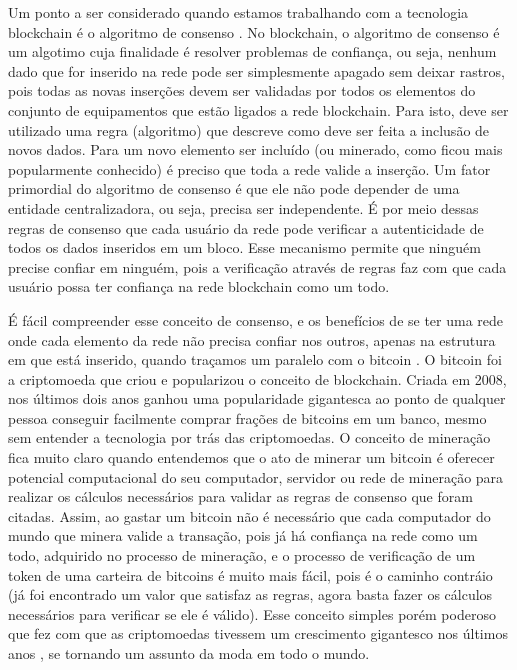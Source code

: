 Um ponto a ser considerado quando estamos trabalhando com a tecnologia blockchain é o algoritmo de consenso \cite{zheng2017overview}. No blockchain, o algoritmo de consenso é um algotimo cuja finalidade é resolver problemas de confiança, ou seja, nenhum dado que for inserido na rede pode ser simplesmente apagado sem deixar rastros, pois todas as novas inserções devem ser validadas por todos os elementos do conjunto de equipamentos que estão ligados a rede blockchain. Para isto, deve ser utilizado uma regra (algoritmo) que descreve como deve ser feita a inclusão de novos dados. Para um novo elemento ser incluído (ou minerado, como ficou mais popularmente conhecido) é preciso que toda a rede valide a inserção. Um fator primordial do algoritmo de consenso é que ele não pode depender de uma entidade centralizadora, ou seja, precisa ser independente. É por meio dessas regras de consenso que cada usuário da rede pode verificar a autenticidade de todos os dados inseridos em um bloco. Esse mecanismo permite que ninguém precise confiar em ninguém, pois a verificação através de regras faz com que cada usuário possa ter confiança na rede blockchain como um todo.

É fácil compreender esse conceito de consenso, e os benefícios de se ter uma rede onde cada elemento da rede não precisa confiar nos outros, apenas na estrutura em que está inserido, quando traçamos um paralelo com o bitcoin \cite{nakamoto2008bitcoin}. O bitcoin foi a criptomoeda que criou e popularizou o conceito de blockchain. Criada em 2008, nos últimos dois anos ganhou uma popularidade gigantesca ao ponto de qualquer pessoa conseguir facilmente comprar frações de bitcoins em um banco, mesmo sem entender a tecnologia por trás das criptomoedas. O conceito de mineração fica muito claro quando entendemos que o ato de minerar um bitcoin é oferecer potencial computacional do seu computador, servidor ou rede de mineração para realizar os cálculos necessários para validar as regras de consenso que foram citadas. Assim, ao gastar um bitcoin não é necessário que cada computador do mundo que minera valide a transação, pois já há confiança na rede como um todo, adquirido no processo de mineração, e o processo de verificação de um token de uma carteira de bitcoins é muito mais fácil, pois é o caminho contráio (já foi encontrado um valor que satisfaz as regras, agora basta fazer os cálculos necessários para verificar se ele é válido). Esse conceito simples porém poderoso que fez com que as criptomoedas tivessem um crescimento gigantesco nos últimos anos \cite{vasek2015there}, se tornando um assunto da moda em todo o mundo.

